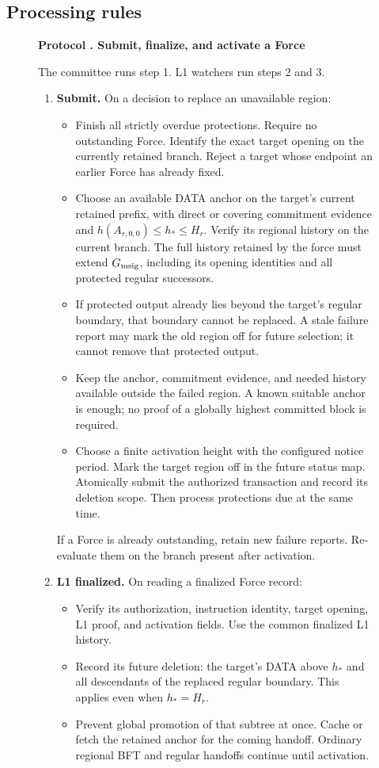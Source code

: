 \documentclass[11pt,a4paper]{article}
\newcounter{protocol}
\newenvironment{protocol}[2]{\begin{figure}[htbp]\refstepcounter{protocol}\label{#1}
\begin{mdframed}[linewidth=.6pt,skipabove=0pt,skipbelow=0pt,
innertopmargin=7pt,innerbottommargin=7pt]\small
\textbf{Protocol \theprotocol. #2}\par\smallskip}{\end{mdframed}\end{figure}}
\begin{document}
\subsection{Processing rules}
\begin{protocol}{alg:force}{Submit, finalize, and activate a Force}
The committee runs step 1. L1 watchers run steps 2 and 3.
\begin{enumerate}[label=\textbf{\arabic*)},itemsep=3pt]
\item \textbf{Submit.} On a decision to replace an unavailable region:
\begin{itemize}
\item Finish all strictly overdue protections. Require no outstanding
Force. Identify the exact target opening on the currently retained
branch. Reject a target whose endpoint an earlier Force has already fixed.
\item Choose an available DATA anchor on the target's current retained
prefix, with direct or covering commitment evidence and
$h(A_{r,0,0})\le h_*\le H_r$. Verify
its regional history on the current branch. The full history retained by the force
must extend $G_{\rm msig}$, including its opening identities and all
protected regular successors.
\item If protected output already lies beyond the target's regular
boundary, that boundary cannot be replaced. A stale failure report may
mark the old region off for future selection; it cannot remove that
protected output.
\item Keep the anchor, commitment evidence, and needed history available outside
the failed region. A known suitable anchor is enough; no proof of a
globally highest committed block is required.
\item Choose a finite activation height with the configured notice
period. Mark the target region off in the future status map. Atomically
submit the authorized transaction and record its deletion scope. Then
process protections due at the same time.
\end{itemize}
If a Force is already outstanding, retain new failure reports. Re-evaluate
them on the branch present after activation.

\item \textbf{L1 finalized.} On reading a finalized Force record:
\begin{itemize}
\item Verify its authorization, instruction identity, target opening,
L1 proof, and activation fields. Use the common finalized L1 history.
\item Record its future deletion: the target's DATA above $h_*$ and
all descendants of the replaced regular boundary. This applies even
when $h_*=H_r$.
\item Prevent global promotion of that subtree at once. Cache or fetch
the retained anchor for the coming handoff. Ordinary regional BFT and
regular handoffs continue until activation.
\end{itemize}


\end{enumerate}
\end{protocol}
\end{document}
